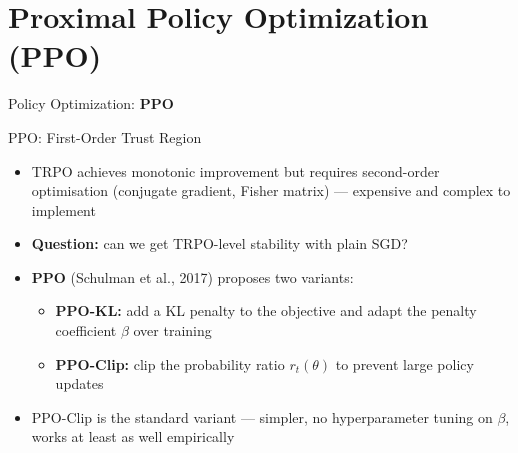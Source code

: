 \section{Proximal Policy Optimization (PPO)}
\begin{frame}{}
    \LARGE Policy Optimization: \textbf{PPO}
\end{frame}

\begin{frame}{PPO: First-Order Trust Region}
\begin{itemize}
    \item TRPO achieves monotonic improvement but requires second-order optimisation (conjugate gradient, Fisher matrix) --- expensive and complex to implement
    \item \textbf{Question:} can we get TRPO-level stability with plain SGD?
    \pause
    \item \textbf{PPO} (Schulman et al., 2017) proposes two variants:
    \begin{itemize}
        \item \textbf{PPO-KL:} add a KL penalty to the objective and adapt the penalty coefficient $\beta$ over training
        \item \textbf{PPO-Clip:} clip the probability ratio $r_t(\theta)$ to prevent large policy updates
    \end{itemize}
    \item PPO-Clip is the standard variant --- simpler, no hyperparameter tuning on $\beta$, works at least as well empirically
\end{itemize}
\end{frame}
